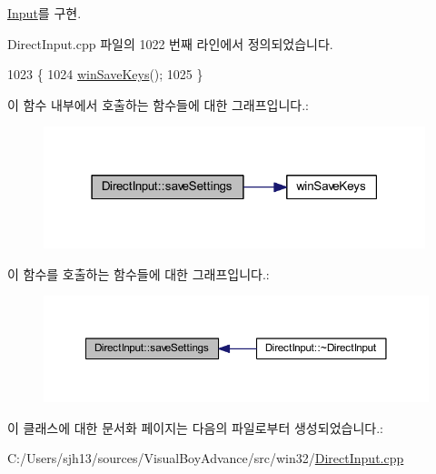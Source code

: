\mbox{\hyperlink{class_input_a90c42a9d91bf671aaee3d5f611199eec}{Input}}를 구현.



Direct\+Input.\+cpp 파일의 1022 번째 라인에서 정의되었습니다.


\begin{DoxyCode}
1023 \{
1024     \mbox{\hyperlink{_direct_input_8cpp_a32464ab003ba84961ce16d69c6504b3d}{winSaveKeys}}();
1025 \}
\end{DoxyCode}
이 함수 내부에서 호출하는 함수들에 대한 그래프입니다.\+:
\nopagebreak
\begin{figure}[H]
\begin{center}
\leavevmode
\includegraphics[width=315pt]{class_direct_input_aaf3473a97962c8dad1ef6715b5164c9d_cgraph}
\end{center}
\end{figure}
이 함수를 호출하는 함수들에 대한 그래프입니다.\+:
\nopagebreak
\begin{figure}[H]
\begin{center}
\leavevmode
\includegraphics[width=350pt]{class_direct_input_aaf3473a97962c8dad1ef6715b5164c9d_icgraph}
\end{center}
\end{figure}


이 클래스에 대한 문서화 페이지는 다음의 파일로부터 생성되었습니다.\+:\begin{DoxyCompactItemize}
\item 
C\+:/\+Users/sjh13/sources/\+Visual\+Boy\+Advance/src/win32/\mbox{\hyperlink{_direct_input_8cpp}{Direct\+Input.\+cpp}}\end{DoxyCompactItemize}
